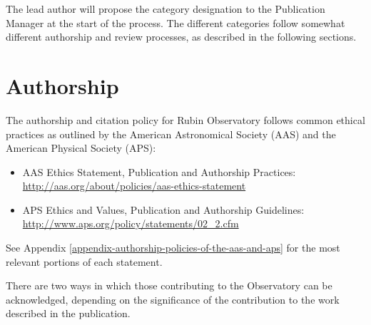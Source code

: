 The lead author will propose the category designation to the Publication Manager at the start of the process.
The different categories follow somewhat different authorship and review processes, as described in the following sections.

\section{\texorpdfstring{Authorship }{Authorship }}\label{authorship}

The authorship and citation policy for Rubin Observatory follows common ethical practices as outlined by the American Astronomical Society (AAS) and the American Physical Society (APS):

\begin{itemize}
\item
  AAS Ethics Statement, Publication and Authorship Practices:
  \url{http://aas.org/about/policies/aas-ethics-statement}
\item
  APS Ethics and Values, Publication and Authorship Guidelines:
  \url{http://www.aps.org/policy/statements/02_2.cfm}
\end{itemize}

See Appendix \ref{appendix-authorship-policies-of-the-aas-and-aps} for the most relevant portions of each statement.

There are two ways in which those contributing to the Observatory can be acknowledged, depending on the significance of the contribution to the work described in the publication.

